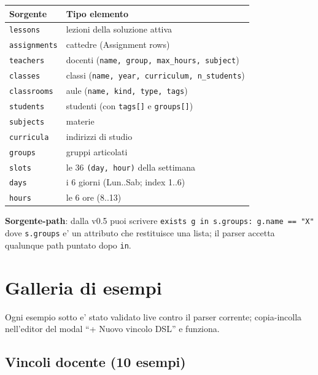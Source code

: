 \begin{tabular}{ll}
\toprule
\textbf{Sorgente} & \textbf{Tipo elemento} \\
\midrule
\texttt{lessons}     & lezioni della soluzione attiva \\
\texttt{assignments} & cattedre (Assignment rows) \\
\texttt{teachers}    & docenti (\texttt{name, group, max\_hours, subject}) \\
\texttt{classes}     & classi (\texttt{name, year, curriculum, n\_students}) \\
\texttt{classrooms}  & aule (\texttt{name, kind, type, tags}) \\
\texttt{students}    & studenti (con \texttt{tags[]} e \texttt{groups[]}) \\
\texttt{subjects}    & materie \\
\texttt{curricula}   & indirizzi di studio \\
\texttt{groups}      & gruppi articolati \\
\texttt{slots}       & le 36 \texttt{(day, hour)} della settimana \\
\texttt{days}        & i 6 giorni (Lun..Sab; index 1..6) \\
\texttt{hours}       & le 6 ore (8..13) \\
\bottomrule
\end{tabular}

\textbf{Sorgente-path}: dalla v0.5 puoi scrivere
\texttt{exists g in s.groups: g.name == "X"} dove \texttt{s.groups}
e' un attributo che restituisce una lista; il parser accetta
qualunque path puntato dopo \texttt{in}.

\section{Galleria di esempi}

Ogni esempio sotto e' stato validato live contro il parser
corrente; copia-incolla nell'editor del modal ``+ Nuovo vincolo
DSL'' e funziona.

\subsection{Vincoli docente (10 esempi)}

